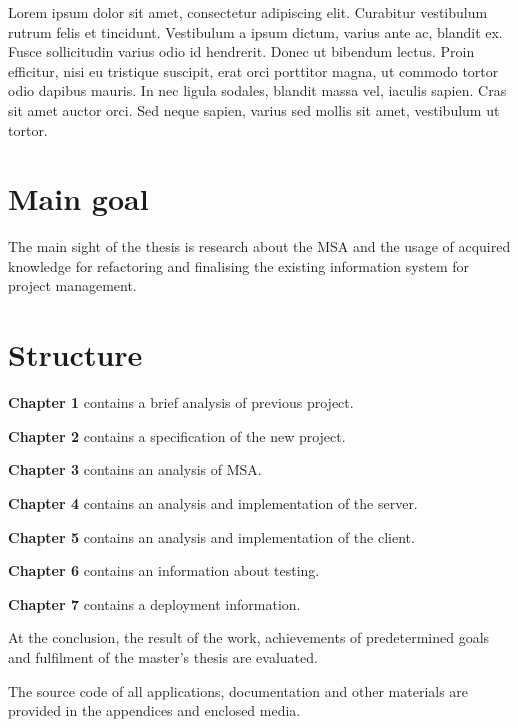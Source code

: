 Lorem ipsum dolor sit amet, consectetur adipiscing elit. Curabitur vestibulum rutrum felis et tincidunt. Vestibulum a ipsum dictum, varius ante ac, blandit ex. Fusce sollicitudin varius odio id hendrerit. Donec ut bibendum lectus. Proin efficitur, nisi eu tristique suscipit, erat orci porttitor magna, ut commodo tortor odio dapibus mauris. In nec ligula sodales, blandit massa vel, iaculis sapien. Cras sit amet auctor orci. Sed neque sapien, varius sed mollis sit amet, vestibulum ut tortor.


\section{Main goal}
The main sight of the thesis is research about the \gls{MSA} and the usage of acquired knowledge for refactoring and finalising the existing information system for project management.


\clearpage
\section{Structure}

\textbf{Chapter 1} contains a brief analysis of previous project.

\textbf{Chapter 2} contains a specification of the new project.

\textbf{Chapter 3} contains an analysis of \gls{MSA}.

\textbf{Chapter 4} contains an analysis and implementation of the server.

\textbf{Chapter 5} contains an analysis and implementation of the client.

\textbf{Chapter 6} contains an information about testing.

\textbf{Chapter 7} contains a deployment information.

At the conclusion, the result of the work, achievements of predetermined goals and fulfilment of the master's thesis are evaluated.

The source code of all applications, documentation and other materials are provided in the appendices and enclosed media.
